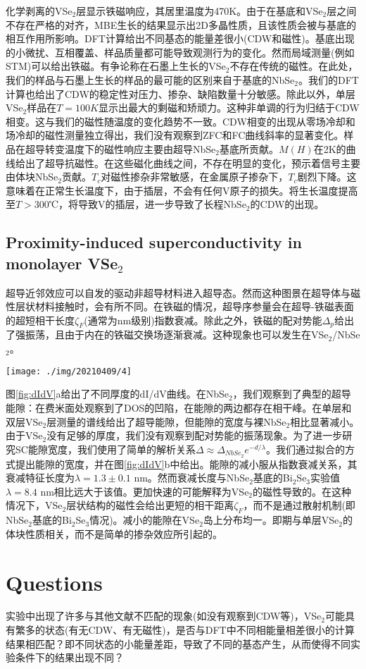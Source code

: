 \documentclass[reprint, aps, prb, showkeys]{revtex4-2}
\begin{document}
化学剥离的VSe$_2$层显示铁磁响应，其居里温度为470K。由于在基底和VSe$_2$层之间不存在严格的对齐，MBE生长的结果显示出2D多晶性质，且该性质会被与基底的相互作用所影响。DFT计算给出不同基态的能量差很小(CDW和磁性)。基底出现的小微扰、互相覆盖、样品质量都可能导致观测行为的变化。然而局域测量(例如STM)可以给出铁磁。有争论称在石墨上生长的VSe$_2$不存在传统的磁性。在此处，我们的样品与石墨上生长的样品的最可能的区别来自于基底的NbSe$_2$。我们的DFT计算也给出了CDW的稳定性对压力、掺杂、缺陷数量十分敏感。除此以外，单层VSe$_2$样品在$T = 100 K$显示出最大的剩磁和矫顽力。这种非单调的行为归结于CDW相变。这与我们的磁性随温度的变化趋势不一致。CDW相变的出现从零场冷却和场冷却的磁性测量独立得出，我们没有观察到ZFC和FC曲线斜率的显著变化。样品在超导转变温度下的磁性响应主要由超导NbSe$_2$基底所贡献。$M(H)$在2K的曲线给出了超导抗磁性。在这些磁化曲线之间，不存在明显的变化，预示着信号主要由体块NbSe$_2$贡献。$T_c$对磁性掺杂非常敏感，在金属原子掺杂下，$T_c$剧烈下降。这意味着在正常生长温度下，由于插层，不会有任何V原子的损失。将生长温度提高至$T > 300 $℃，将导致V的插层，进一步导致了长程NbSe$_2$的CDW的出现。

\subsection{Proximity-induced superconductivity in monolayer VSe$_2$}
超导近邻效应可以自发的驱动非超导材料进入超导态。然而这种图景在超导体与磁性层状材料接触时，会有所不同。在铁磁的情况，超导序参量会在超导-铁磁表面的超短相干长度$\zeta_F$(通常为nm级别)指数衰减。除此之外，铁磁的配对势能$\Delta_p$给出了强振荡，且由于内在的铁磁交换场逐渐衰减。这种现象也可以发生在VSe$_2$/NbSe$_2$。
\begin{figure*}[b]
    \texttt{[image: ./img/20210409/4]}
    \caption{\label{fig:dIdV} 
    dI/dV 谱。
    }
\end{figure*}
图\ref{fig:dIdV}a给出了不同厚度的dI/dV曲线。在NbSe$_2$，我们观察到了典型的超导能隙：在费米面处观察到了DOS的凹陷，在能隙的两边都存在相干峰。在单层和双层VSe$_2$层测量的谱线给出了超导能隙，但能隙的宽度与裸NbSe$_2$相比显著减小。由于VSe$_2$没有足够的厚度，我们没有观察到配对势能的振荡现象。为了进一步研究SC能隙宽度，我们使用了简单的解析关系$\Delta \approx \Delta_{NbSe_2} e^{-d/\lambda}$。我们通过拟合的方式提出能隙的宽度，并在图\ref{fig:dIdV}b中给出。能隙的减小服从指数衰减关系，其衰减特征长度为$\lambda = 1.3 \pm 0.1$ nm。然而衰减长度与NbSe$_2$基底的Bi$_2$Se$_3$实验值$\lambda = 8.4$ nm相比远大于该值。更加快速的可能解释为VSe$_2$的磁性导致的。在这种情况下，VSe$_2$层状结构的磁性会给出更短的相干距离$\zeta_F$，而不是通过散射机制(即NbSe$_2$基底的Bi$_2$Se$_3$情况)。减小的能隙在VSe$_2$岛上分布均一。即期与单层VSe$_2$的体块性质相关，而不是简单的掺杂效应所引起的。

\section{Questions}
实验中出现了许多与其他文献不匹配的现象(如没有观察到CDW等)，VSe$_2$可能具有繁多的状态(有无CDW、有无磁性)，是否与DFT中不同相能量相差很小的计算结果相匹配？即不同状态的小能量差距，导致了不同的基态产生，从而使得不同实验条件下的结果出现不同？
\end{document}

